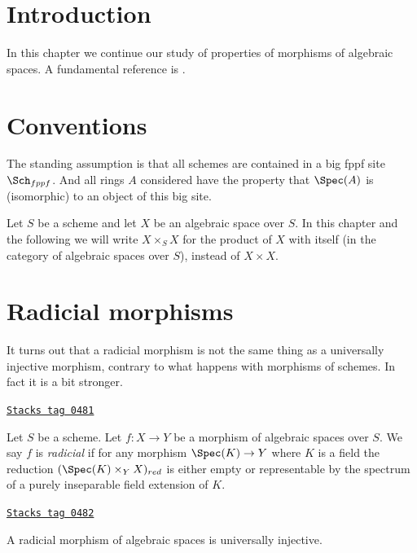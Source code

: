 \section{Introduction}
\label{spaces-more-morphisms-section-introduction}
In this chapter we continue our study of properties of morphisms of algebraic
spaces. A fundamental reference is \cite{Kn}.

\section{Conventions}
\label{spaces-more-morphisms-section-conventions}
The standing assumption is that all schemes are contained in
a big fppf site $\Sch_{fppf}$. And all rings $A$ considered
have the property that $\Spec(A)$ is (isomorphic) to an
object of this big site.

\medskip\noindent
Let $S$ be a scheme and let $X$ be an algebraic space over $S$.
In this chapter and the following we will write $X \times_S X$
for the product of $X$ with itself (in the category of algebraic
spaces over $S$), instead of $X \times X$.

\section{Radicial morphisms}
\label{spaces-more-morphisms-section-radicial}
It turns out that a radicial morphism is not the same thing as a
universally injective morphism, contrary to what happens with
morphisms of schemes. In fact it is a bit stronger.

\begin{definition}[Radicial]
\label{spaces-more-morphisms-definition-radicial}
\href{https://stacks.math.columbia.edu/tag/0481}{\texttt{Stacks tag 0481}}

Let $S$ be a scheme. Let $f : X \to Y$ be a morphism of algebraic spaces
over $S$. We say $f$ is {\it radicial} if for any morphism
$\Spec(K) \to Y$ where $K$ is a field the reduction
$(\Spec(K) \times_Y X)_{red}$ is either empty or
representable by the spectrum of a purely inseparable field extension of $K$.
\end{definition}

\begin{lemma}
\label{spaces-more-morphisms-lemma-radicial-implies-universally-injective}
\href{https://stacks.math.columbia.edu/tag/0482}{\texttt{Stacks tag 0482}}

A radicial morphism of algebraic spaces is universally injective.
\end{lemma}

